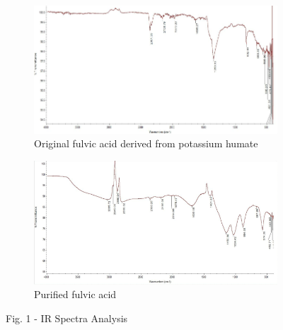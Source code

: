 \begin{figure}[H]
    \centering
    \begin{subfigure}{0.49\textwidth}
        \centering
        \includegraphics[width=\linewidth]{media/chem/image2}
        \caption*{Original fulvic acid derived from potassium humate}
    \end{subfigure}
    \hfill
    \begin{subfigure}{0.49\textwidth}
        \centering
        \includegraphics[width=\linewidth]{media/chem/image3}
        \caption*{Purified fulvic acid}
    \end{subfigure}
    \caption*{Fig. 1 - IR Spectra Analysis}
\end{figure}

